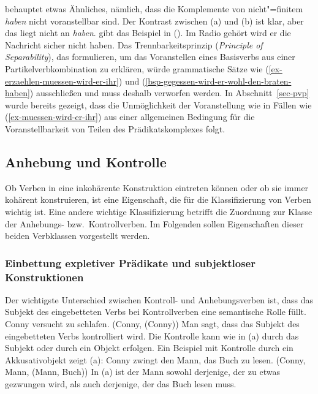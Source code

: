 \noindent
\citet[]{Haider93a} behauptet etwas Ähnliches, nämlich, dass
die Komplemente von nicht"=finitem \emph{haben} nicht voranstellbar sind.
\eal
{}
\zl
Der Kontrast zwischen (a) und (b) ist klar, aber das liegt nicht
an \emph{haben}. \citet[]{Meurers2000b} gibt das Beispiel
in ().
\ea
Im Radio gehört wird er die Nachricht sicher nicht haben.
\z
Das Trennbarkeitsprinzip (\emph{Principle of Separability}),
das \citet[]{SW94a}
formulieren, um das Voranstellen eines Basisverbs aus einer Partikelverbkombination
zu erklären, würde grammatische Sätze wie (\ref{ex-erzaehlen-muessen-wird-er-ihr}) 
und (\ref{bsp-gegessen-wird-er-wohl-den-braten-haben}) ausschließen und muss deshalb verworfen werden.
In Abschnitt~\ref{sec-pvp} wurde bereits gezeigt, dass die Unmöglichkeit der
Voranstellung wie in Fällen wie (\ref{ex-muessen-wird-er-ihr}) aus einer allgemeinen
Bedingung für die Voranstellbarkeit von Teilen des Prädikatskomplexes folgt.



\subsection{Anhebung und Kontrolle}
\label{sec-anhebung}

Ob Verben in eine inkohärente Konstruktion eintreten können
oder ob sie immer kohärent konstruieren, ist eine Eigenschaft, die für die Klassifizierung
von Verben wichtig ist. Eine andere wichtige Klassifizierung betrifft die Zuordnung zur Klasse
der Anhebungs- bzw.\ Kontrollverben. Im Folgenden sollen Eigenschaften dieser beiden Verbklassen 
vorgestellt werden.

\subsubsection{Einbettung expletiver Prädikate und subjektloser Konstruktionen}
\label{expl-pred-subj-constr}

Der wichtigste Unterschied zwischen Kontroll- und Anhebungsverben ist, dass das Subjekt
des eingebetteten Verbs bei Kontrollverben eine semantische Rolle füllt.
\eal
\ex Conny versucht zu schlafen.
\ex {}(Conny, (Conny))
\zl
Man sagt, dass das Subjekt des eingebetteten Verbs kontrolliert wird. Die Kontrolle
kann wie in (a) durch das Subjekt oder durch ein Objekt erfolgen. Ein Beispiel
mit Kontrolle durch ein Akkusativobjekt zeigt (a):
\eal
\ex Conny zwingt den Mann, das Buch zu lesen.
\ex {}(Conny, Mann, (Mann, Buch))
\zl
In (a) ist der Mann sowohl derjenige, der zu etwas gezwungen wird, als auch
derjenige, der das Buch lesen muss.

